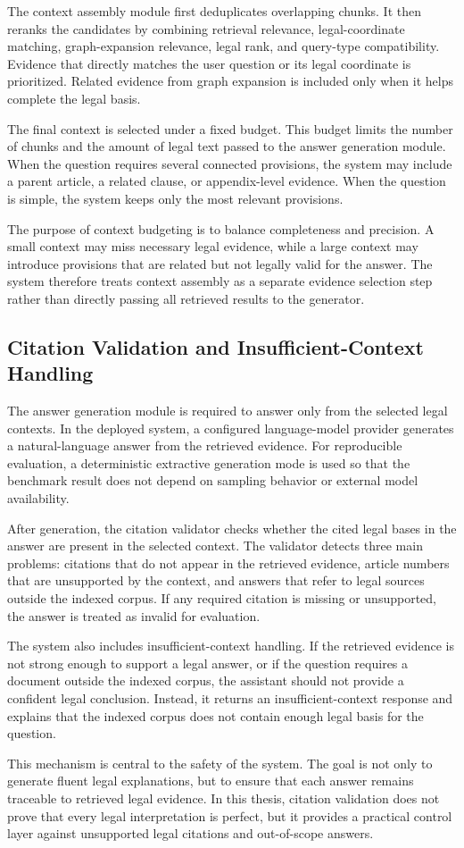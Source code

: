 The context assembly module first deduplicates overlapping chunks. It then reranks the candidates by combining retrieval relevance, legal-coordinate matching, graph-expansion relevance, legal rank, and query-type compatibility. Evidence that directly matches the user question or its legal coordinate is prioritized. Related evidence from graph expansion is included only when it helps complete the legal basis.

The final context is selected under a fixed budget. This budget limits the number of chunks and the amount of legal text passed to the answer generation module. When the question requires several connected provisions, the system may include a parent article, a related clause, or appendix-level evidence. When the question is simple, the system keeps only the most relevant provisions.

The purpose of context budgeting is to balance completeness and precision. A small context may miss necessary legal evidence, while a large context may introduce provisions that are related but not legally valid for the answer. The system therefore treats context assembly as a separate evidence selection step rather than directly passing all retrieved results to the generator.

\subsection{Citation Validation and Insufficient-Context Handling}
The answer generation module is required to answer only from the selected legal contexts. In the deployed system, a configured language-model provider generates a natural-language answer from the retrieved evidence. For reproducible evaluation, a deterministic extractive generation mode is used so that the benchmark result does not depend on sampling behavior or external model availability.

After generation, the citation validator checks whether the cited legal bases in the answer are present in the selected context. The validator detects three main problems: citations that do not appear in the retrieved evidence, article numbers that are unsupported by the context, and answers that refer to legal sources outside the indexed corpus. If any required citation is missing or unsupported, the answer is treated as invalid for evaluation.

The system also includes insufficient-context handling. If the retrieved evidence is not strong enough to support a legal answer, or if the question requires a document outside the indexed corpus, the assistant should not provide a confident legal conclusion. Instead, it returns an insufficient-context response and explains that the indexed corpus does not contain enough legal basis for the question.

This mechanism is central to the safety of the system. The goal is not only to generate fluent legal explanations, but to ensure that each answer remains traceable to retrieved legal evidence. In this thesis, citation validation does not prove that every legal interpretation is perfect, but it provides a practical control layer against unsupported legal citations and out-of-scope answers.
